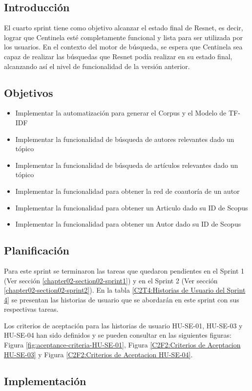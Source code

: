 \subsection{Introducción}
El cuarto sprint tiene como objetivo alcanzar el estado final de Resnet,
es decir, lograr que Centinela esté completamente funcional y lista para ser
utilizada por los usuarios. En el contexto del motor de búsqueda,
se espera que  Centinela sea capaz de realizar las búsquedas
que Resnet podía realizar en su estado final, alcanzando así el nivel de funcionalidad de la versión anterior.
\subsection{Objetivos}
\begin{itemize}
    \item Implementar la automatización para generar el Corpus y el Modelo de TF-IDF
    \item Implementar la funcionalidad de búsqueda de autores relevantes dado un tópico
    \item Implementar la funcionalidad de búsqueda de artículos relevantes dado un tópico
    \item Implementar la funcionalidad para obtener la red de coautoría de un autor
    \item Implementar la funcionalidad para obtener un Articulo dado su ID de Scopus
    \item Implementar la funcionalidad para obtener un Autor dado su ID de Scopus
\end{itemize}
\subsection{Planificación}
Para este sprint se terminaron las tareas que quedaron pendientes en el Sprint 1 (Ver sección \ref{chapter02-section02-sprint1})  y en el Sprint 2 (Ver sección \ref{chapter02-section02-sprint2}).
En la tabla \ref{C2T4:Historias de Usuario del Sprint 4} se presentan las historias de usuario que se abordarán en este sprint con sus respectivas tareas.


Los criterios de aceptación para las historias de usuario HU-SE-01, HU-SE-03 y HU-SE-04 han sido definidos y se pueden consultar en las siguientes figuras: Figura \ref{fig:aceptance-criteria-HU-SE-01}, Figura \ref{C2F2:Criterios de Aceptacion HU-SE-03} y Figura \ref{C2F2:Criterios de Aceptacion HU-SE-04}.
\subsection{Implementación}

